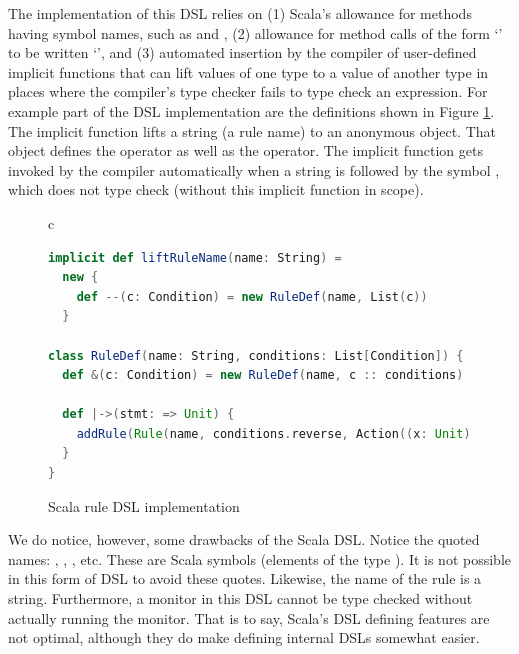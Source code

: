 The implementation of this DSL relies on (1) Scala's
allowance for methods having symbol names, such as \iscala{--}
and \iscala{|->}, (2) allowance for method calls of the form 
`' to be written 
`', and (3) automated insertion by 
the compiler of 
user-defined implicit functions that can lift values of one type 
to a value of another type in places where the compiler's type 
checker fails to type check an expression. For example part of
the DSL implementation are the definitions shown in Figure
\ref{fig:dsl-scala}.
The implicit function  lifts a string (a
rule name) to an anonymous object. That object defines the 
\iscala{&} operator as well as the
\iscala{|->} operator. The implicit function  
gets invoked by the compiler automatically when a string is 
followed by the symbol \iscala{--}, which does not
type check (without this implicit function in scope).

\begin{figure}
\begin{center}
\begin{tabular}{c}
\begin{lstlisting}[language=scala]
implicit def liftRuleName(name: String) = 
  new { 
    def --(c: Condition) = new RuleDef(name, List(c)) 
  }

class RuleDef(name: String, conditions: List[Condition]) { 
  def &(c: Condition) = new RuleDef(name, c :: conditions)

  def |->(stmt: => Unit) { 
    addRule(Rule(name, conditions.reverse, Action((x: Unit) => stmt))) 
  } 
}
\end{lstlisting}
\end{tabular}
\end{center}
\caption{Scala rule DSL implementation}
\label{fig:dsl-scala}
\end{figure}

We do notice, however, some drawbacks of the Scala DSL.
Notice the quoted names: , , 
, etc. These are Scala symbols (elements of the type 
). It is not possible in this form of DSL to avoid 
these quotes. Likewise, the name of the rule is a string. 
Furthermore, a monitor in this DSL cannot be type checked without 
actually running the monitor. That is to say, Scala's DSL defining
features are not optimal, although they do make defining internal 
DSLs somewhat easier.
